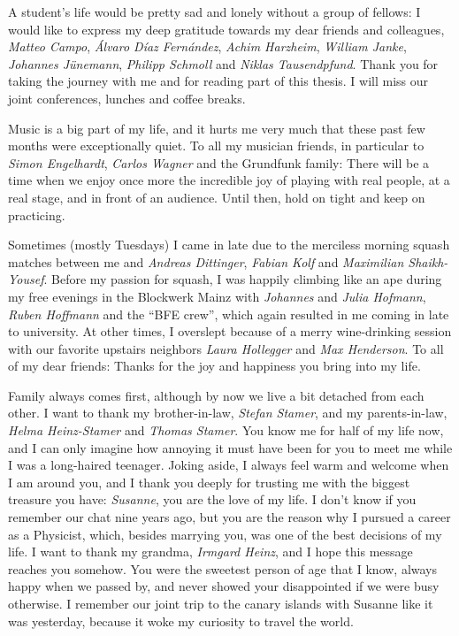 A student's life would be pretty sad and lonely without a group of fellows:
I would like to express my deep gratitude towards my dear friends and colleagues, {\it Matteo Campo}, {\it Álvaro Díaz Fernández}, {\it Achim Harzheim}, {\it William Janke}, {\it Johannes Jünemann}, {\it Philipp Schmoll} and {\it Niklas Tausendpfund}.
Thank you for taking the journey with me and for reading part of this thesis.
I will miss our joint conferences, lunches and coffee breaks.

Music is a big part of my life, and it hurts me very much that these past few months were exceptionally quiet.
To all my musician friends, in particular to {\it Simon Engelhardt}, {\it Carlos Wagner} and the Grundfunk family:
There will be a time when we enjoy once more the incredible joy of playing with real people, at a real stage, and in front of an audience.
Until then, hold on tight and keep on practicing.

Sometimes (mostly Tuesdays) I came in late due to the merciless morning squash matches between me and {\it Andreas Dittinger}, {\it Fabian Kolf} and {\it Maximilian Shaikh-Yousef}.
Before my passion for squash, I was happily climbing like an ape during my free evenings in the Blockwerk Mainz with {\it Johannes} and {\it Julia Hofmann}, {\it Ruben Hoffmann} and the ``BFE crew'', which again resulted in me coming in late to university.
At other times, I overslept because of a merry wine-drinking session with our favorite upstairs neighbors {\it Laura Hollegger} and {\it Max Henderson}.
To all of my dear friends: Thanks for the joy and happiness you bring into my life.

Family always comes first, although by now we live a bit detached from each other.
I want to thank my brother-in-law, {\it Stefan Stamer}, and my parents-in-law, {\it Helma Heinz-Stamer} and {\it Thomas Stamer}.
You know me for half of my life now, and I can only imagine how annoying it must have been for you to meet me while I was a long-haired teenager.
Joking aside, I always feel warm and welcome when I am around you, and I thank you deeply for trusting me with the biggest treasure you have:
{\it Susanne}, you are the love of my life.
I don't know if you remember our chat nine years ago, but you are the reason why I pursued a career as a Physicist, which, besides marrying you, was one of the best decisions of my life.
I want to thank my grandma, {\it Irmgard Heinz}, and I hope this message reaches you somehow.
You were the sweetest person of age that I know, always happy when we passed by, and never showed your disappointed if we were busy otherwise.
I remember our joint trip to the canary islands with Susanne like it was yesterday, because it woke my curiosity to travel the world.

